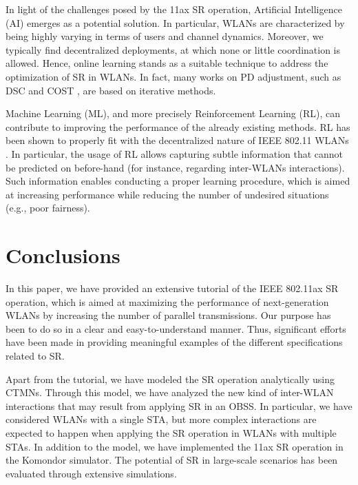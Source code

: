 \documentclass[comsoc]{IEEEtran}
\begin{document}
	In light of the challenges posed by the 11ax SR operation, Artificial Intelligence (AI) emerges as a potential solution. In particular, WLANs are characterized by being highly varying in terms of users and channel dynamics. Moreover, we typically find decentralized deployments, at which none or little coordination is allowed. Hence, online learning stands as a suitable technique to address the optimization of SR in WLANs. In fact, many works on PD adjustment, such as DSC \cite{smith2015dynamic} and COST \cite{selinis2018control}, are based on iterative methods. 
	
	Machine Learning (ML), and more precisely Reinforcement Learning (RL), can contribute to improving the performance of the already existing methods. RL has been shown to properly fit with the decentralized nature of IEEE 802.11 WLANs \cite{wilhelmi2019collaborative, wilhelmi2019potential}. In particular, the usage of RL allows capturing subtle information that cannot be predicted on before-hand (for instance, regarding inter-WLANs interactions). Such information enables conducting a proper learning procedure, which is aimed at increasing performance while reducing the number of undesired situations (e.g., poor fairness).
	
	\section{Conclusions}
	\label{section:conclusions}
	
	In this paper, we have provided an extensive tutorial of the IEEE 802.11ax SR operation, which is aimed at maximizing the performance of next-generation WLANs by increasing the number of parallel transmissions. Our purpose has been to do so in a clear and easy-to-understand manner. Thus, significant efforts have been made in providing meaningful examples of the different specifications related to SR. %
	
	Apart from the tutorial, we have modeled the SR operation analytically using CTMNs. Through this model, we have analyzed the new kind of inter-WLAN interactions that may result from applying SR in an OBSS. In particular, we have considered WLANs with a single STA, but more complex interactions are expected to happen when applying the SR operation in WLANs with multiple STAs. In addition to the model, we have implemented the 11ax SR operation in the Komondor simulator. The potential of SR in large-scale scenarios has been evaluated through extensive simulations.
	
\end{document}
